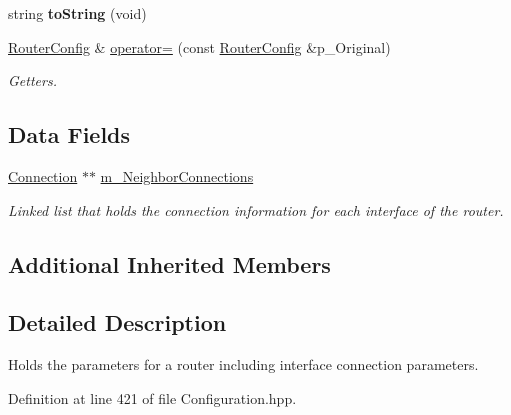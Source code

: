 \begin{DoxyCompactItemize}
\item 
\hypertarget{classRouterConfig_abfd13ba5c09c9d9544de65ae923eaaad}{string {\bfseries to\-String} (void)}\label{classRouterConfig_abfd13ba5c09c9d9544de65ae923eaaad}

\item 
\hyperlink{classRouterConfig}{Router\-Config} \& \hyperlink{classRouterConfig_ab0bb5ea6cea6663966400c69c231560b}{operator=} (const \hyperlink{classRouterConfig}{Router\-Config} \&p\-\_\-\-Original)
\begin{DoxyCompactList}\small\item\em Getters. \end{DoxyCompactList}\end{DoxyCompactItemize}
\subsection*{Data Fields}
\begin{DoxyCompactItemize}
\item 
\hypertarget{classRouterConfig_a14109cff8cff86a75f09fa502ef181f2}{\hyperlink{classConnection}{Connection} $\ast$$\ast$ \hyperlink{classRouterConfig_a14109cff8cff86a75f09fa502ef181f2}{m\-\_\-\-Neighbor\-Connections}}\label{classRouterConfig_a14109cff8cff86a75f09fa502ef181f2}

\begin{DoxyCompactList}\small\item\em Linked list that holds the connection information for each interface of the router. \end{DoxyCompactList}\end{DoxyCompactItemize}
\subsection*{Additional Inherited Members}


\subsection{Detailed Description}
Holds the parameters for a router including interface connection parameters. 

Definition at line 421 of file Configuration.\-hpp.



